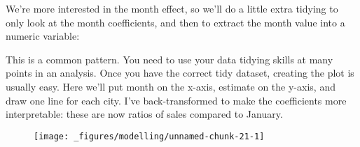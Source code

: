 We're more interested in the month effect, so we'll do a little extra
tidying to only look at the month coefficients, and then to extract the
month value into a numeric variable:

\begin{Shaded}
\end{Shaded}

This is a common pattern. You need to use your data tidying skills at
many points in an analysis. Once you have the correct tidy dataset,
creating the plot is usually easy. Here we'll put month on the x-axis,
estimate on the y-axis, and draw one line for each city. I've
back-transformed to make the coefficients more interpretable: these are
now ratios of sales compared to January.

\begin{Shaded}
\begin{Highlighting}[]
 \NormalTok{^}\StringTok{ }
\StringTok{  }\NormalTok{(}\NormalTok{(} 
\end{Highlighting}
\end{Shaded}

\begin{figure}[H]
  \centering
  \texttt{[image: \_figures/modelling/unnamed-chunk-21-1]}
\end{figure}


